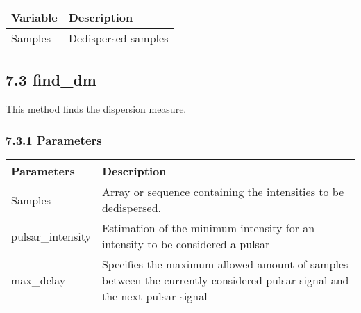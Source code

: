 \documentclass[]{article}
\begin{document}
\begin{longtable}[]{@{}ll@{}}
\toprule
Variable & Description\tabularnewline
\midrule
\endhead
Samples & Dedispersed samples\tabularnewline
\bottomrule
\end{longtable}

\subsection{7.3 find\_dm}\label{find_dm}

This method finds the dispersion measure.

\subsubsection{7.3.1 Parameters}\label{parameters-5}

\begin{longtable}[]{@{}ll@{}}
\toprule
\begin{minipage}[b]{0.41\columnwidth}\raggedright\strut
Parameters\strut
\end{minipage} & \begin{minipage}[b]{0.41\columnwidth}\raggedright\strut
Description\strut
\end{minipage}\tabularnewline
\midrule
\endhead
\begin{minipage}[t]{0.41\columnwidth}\raggedright\strut
Samples\strut
\end{minipage} & \begin{minipage}[t]{0.41\columnwidth}\raggedright\strut
Array or sequence containing the intensities to be dedispersed.\strut
\end{minipage}\tabularnewline
\begin{minipage}[t]{0.41\columnwidth}\raggedright\strut
pulsar\_intensity\strut
\end{minipage} & \begin{minipage}[t]{0.41\columnwidth}\raggedright\strut
Estimation of the minimum intensity for an intensity to be considered a
pulsar\strut
\end{minipage}\tabularnewline
\begin{minipage}[t]{0.41\columnwidth}\raggedright\strut
max\_delay\strut
\end{minipage} & \begin{minipage}[t]{0.41\columnwidth}\raggedright\strut
Specifies the maximum allowed amount of samples between the currently
considered pulsar signal and the next pulsar signal\strut
\end{minipage}\tabularnewline
\bottomrule
\end{longtable}
\end{document}
